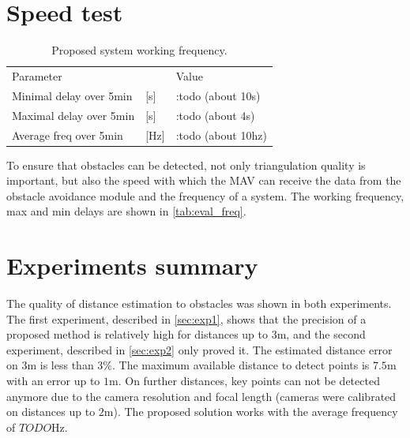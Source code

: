 \section{Speed test}
\begin{table}[ht]
    \begin{center}
      \begin{tabular}{lll}
      \hline
        Parameter & & Value \\
        Minimal delay over 5min & [s]  & :todo (about 10s)\\
        Maximal delay over 5min & [s]  & :todo (about 4s)\\
        Average freq over 5min  & [Hz] & :todo (about 10hz)\\ 
      \end{tabular}
    \end{center}
    \caption{Proposed system working frequency.}
    \label{tab:eval_freq}
\end{table}

To ensure that obstacles can be detected, not only triangulation quality is important, but also the speed with which the MAV can receive the data from the obstacle avoidance module and the frequency of a system.
The working frequency, max and min delays are shown in \autoref{tab:eval_freq}.
 
\section{Experiments summary}
The quality of distance estimation to obstacles was shown in both experiments.
The first experiment, described in \autoref{sec:exp1}, shows that the precision of a proposed method is relatively high for distances up to 3m, and the second experiment, described in \autoref{sec:exp2} only proved it. 
The estimated distance error on $3$m is less than $3\%$.
The maximum available distance to detect points is $7.5$m with an error up to $1$m.
On further distances, key points can not be detected anymore due to the camera resolution and focal length (cameras were calibrated on distances up to $2$m).
The proposed solution works with the average frequency of $TODO$Hz.
